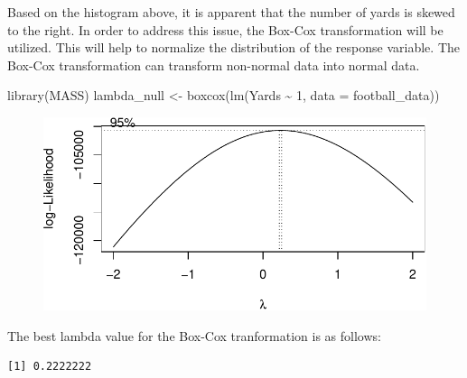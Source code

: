 \documentclass[
  super,
  preprint,
  3p]{elsarticle}
\newenvironment{Shaded}{\begin{snugshade}}{\end{snugshade}}
\newcommand{\AttributeTok}[1]{\textcolor[rgb]{0.40,0.45,0.13}{#1}}
\newcommand{\DecValTok}[1]{\textcolor[rgb]{0.68,0.00,0.00}{#1}}
\newcommand{\FunctionTok}[1]{\textcolor[rgb]{0.28,0.35,0.67}{#1}}
\newcommand{\NormalTok}[1]{\textcolor[rgb]{0.00,0.23,0.31}{#1}}
\newcommand{\OtherTok}[1]{\textcolor[rgb]{0.00,0.23,0.31}{#1}}
\newcommand{\SpecialCharTok}[1]{\textcolor[rgb]{0.37,0.37,0.37}{#1}}
\begin{document}
Based on the histogram above, it is apparent that the number of yards is
skewed to the right. In order to address this issue, the Box-Cox
transformation will be utilized. This will help to normalize the
distribution of the response variable. The Box-Cox transformation can
transform non-normal data into normal data.

\begin{Shaded}
\begin{Highlighting}[]
\FunctionTok{library}\NormalTok{(MASS)}
\NormalTok{lambda\_null }\OtherTok{\textless{}{-}} \FunctionTok{boxcox}\NormalTok{(}\FunctionTok{lm}\NormalTok{(Yards }\SpecialCharTok{\textasciitilde{}} \DecValTok{1}\NormalTok{, }\AttributeTok{data =}\NormalTok{ football\_data))}
\end{Highlighting}
\end{Shaded}

\begin{figure}[H]

{\centering \includegraphics{project_report_files/figure-pdf/unnamed-chunk-20-1.pdf}

}

\end{figure}

The best lambda value for the Box-Cox tranformation is as follows:

\begin{Shaded}
\end{Shaded}

\begin{verbatim}
[1] 0.2222222
\end{verbatim}
\end{document}
